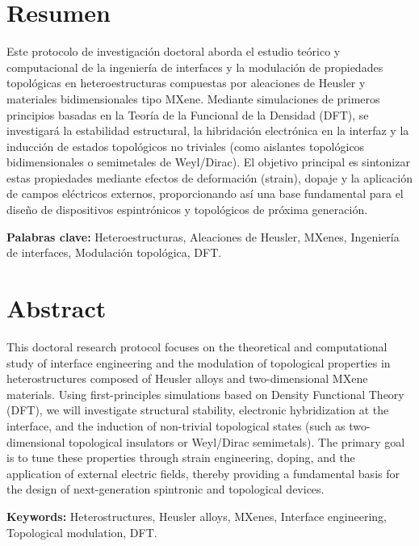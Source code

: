 \section*{Resumen}

Este protocolo de investigación doctoral aborda el estudio teórico y computacional de la ingeniería de interfaces y la modulación de propiedades topológicas en heteroestructuras compuestas por aleaciones de Heusler y materiales bidimensionales tipo MXene. Mediante simulaciones de primeros principios basadas en la Teoría de la Funcional de la Densidad (DFT), se investigará la estabilidad estructural, la hibridación electrónica en la interfaz y la inducción de estados topológicos no triviales (como aislantes topológicos bidimensionales o semimetales de Weyl/Dirac). El objetivo principal es sintonizar estas propiedades mediante efectos de deformación (strain), dopaje y la aplicación de campos eléctricos externos, proporcionando así una base fundamental para el diseño de dispositivos espintrónicos y topológicos de próxima generación.

\vspace{0.5cm}
\noindent \textbf{Palabras clave:} Heteroestructuras, Aleaciones de Heusler, MXenes, Ingeniería de interfaces, Modulación topológica, DFT.

\vspace{1.5cm}

\section*{Abstract}

This doctoral research protocol focuses on the theoretical and computational study of interface engineering and the modulation of topological properties in heterostructures composed of Heusler alloys and two-dimensional MXene materials. Using first-principles simulations based on Density Functional Theory (DFT), we will investigate structural stability, electronic hybridization at the interface, and the induction of non-trivial topological states (such as two-dimensional topological insulators or Weyl/Dirac semimetals). The primary goal is to tune these properties through strain engineering, doping, and the application of external electric fields, thereby providing a fundamental basis for the design of next-generation spintronic and topological devices.

\vspace{0.5cm}
\noindent \textbf{Keywords:} Heterostructures, Heusler alloys, MXenes, Interface engineering, Topological modulation, DFT.
